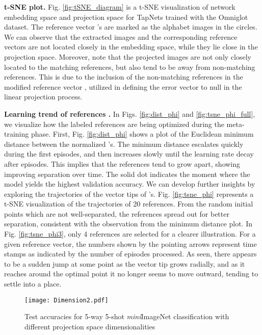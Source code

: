 \documentclass{article}
\begin{document}
\textbf{t-SNE plot.}
Fig. \ref{fig:tSNE_diagram} is a t-SNE visualization of network embedding space and projection space for TapNets trained with the Omniglot dataset. The reference vector 's are marked as the alphabet images in the circles. We can observe that the extracted images and the corresponding reference vectors are not located closely in the embedding space, while they lie close in the projection space. Moreover, note that the projected images are not only closely located to the matching references, but also tend to be away from non-matching references. This is due to the inclusion of the non-matching references in the modified reference vector
,
utilized in defining the error vector to null in the linear projection process.

\textbf{Learning trend of references .} In Figs. \ref{fig:dist_phi} and \ref{fig:tsne_phi_full}, we visualize how the labeled references  are being optimized during the meta-training phase. 
First, Fig. \ref{fig:dist_phi} shows a plot of the Euclidean minimum distance between the normalized 's.
The minimum distance escalates quickly during the first  episodes, and then increases slowly until the learning rate decay after  episodes. This implies that the references tend to grow apart, showing improving separation over time. The solid dot indicates the moment where the model yields the highest validation accuracy.
We can develop further insights by exploring the trajectories of the vector tips of 's. Fig. \ref{fig:tsne_phi} represents a t-SNE visualization of the trajectories of 20 references.
From the random initial points which are not well-separated, the references spread out for better separation, consistent with the observation from the minimum distance plot.
In Fig. \ref{fig:tsne_phi3}, only 4 references are selected for a clearer illustration. For a given reference vector, the numbers shown by the pointing arrows represent time stamps as indicated by the number of episodes processed. As seen, there appears to be a sudden jump at some point as the vector tip grows radially, and as it reaches around the optimal point it no longer seems to move outward, tending to settle into a place.

\begin{figure}[!h]
	\centering
	\texttt{[image: Dimension2.pdf]}
	\caption{Test accuracies for 5-way 5-shot \textit{mini}ImageNet classification with different projection space dimensionalities}
	\label{fig:dimension}
\end{figure}
\end{document}

